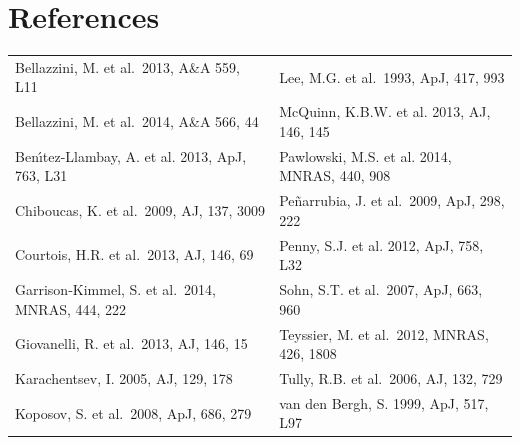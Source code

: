 \section*{References}

{\small
\begin{table}[h]
\begin{tabular}{ll}
Bellazzini, M. et al.\  2013, A\&A 559, L11                 &          Lee, M.G. et al.\ 1993, ApJ, 417, 993 \\ 		    
Bellazzini, M. et al.\  2014, A\&A 566, 44 		    &		McQuinn, K.B.W. et al. 2013, AJ, 146, 145\\				    
Ben{\'{\i}}tez-Llambay, A. et al. 2013, ApJ, 763, L31	    &		Pawlowski, M.S. et al. 2014, MNRAS, 440, 908\\				    
Chiboucas, K. et al.\  2009, AJ, 137, 3009 		    &		Pe{\~n}arrubia, J. et al.\ 2009, ApJ, 298, 222 \\			    
Courtois, H.R. et al.\ 2013, AJ, 146, 69 		    &		Penny, S.J. et al. 2012, ApJ, 758, L32\\		    
Garrison-Kimmel, S. et al.\ 2014, MNRAS, 444, 222 & Sohn, S.T. et al.\ 2007, ApJ, 663, 960\\		
Giovanelli, R. et al.\ 2013, AJ, 146, 15 		    &		Teyssier, M. et al.\ 2012, MNRAS, 426, 1808\\				    
Karachentsev, I. 2005, AJ, 129, 178			    &		Tully, R.B. et al.\ 2006, AJ, 132, 729\\				    
Koposov, S. et al.\ 2008, ApJ, 686, 279                     &		van den Bergh, S. 1999, ApJ, 517, L97\\                                     

\end{tabular}
\end{table}
}
